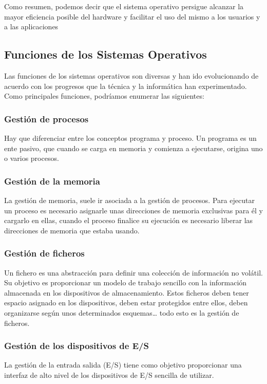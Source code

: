 \documentclass[11pt]{article}
\begin{document}
Como resumen, podemos decir que el sistema operativo persigue alcanzar
la mayor eficiencia posible del hardware y facilitar el uso del mismo a
los usuarios y a las aplicaciones

\newpage
\subsection{Funciones de los Sistemas Operativos}
\label{sec:org7e8a05f}
Las funciones de los sistemas operativos son diversas y han ido
evolucionando de acuerdo con los progresos que la técnica y la
informática han experimentado. Como principales funciones, podríamos
enumerar las siguientes:

\subsubsection{Gestión de procesos}
\label{sec:org65be71b}
Hay que diferenciar entre los conceptos programa y proceso. Un programa
es un ente pasivo, que cuando se carga en memoria y comienza a
ejecutarse, origina uno o varios procesos.

\subsubsection{Gestión de la memoria}
\label{sec:org752bfe5}
La gestión de memoria, suele ir asociada a la gestión de procesos. Para
ejecutar un proceso es necesario asignarle unas direcciones de memoria
exclusivas para él y cargarlo en ellas, cuando el proceso finalice su
ejecución es necesario liberar las direcciones de memoria que estaba
usando.

\subsubsection{Gestión de ficheros}
\label{sec:org95340e9}
Un fichero es una abstracción para definir una colección de información
no volátil. Su objetivo es proporcionar un modelo de trabajo sencillo
con la información almacenada en los dispositivos de almacenamiento.
Estos ficheros deben tener espacio asignado en los dispositivos, deben
estar protegidos entre ellos, deben organizarse según unos determinados
esquemas\ldots{} todo esto es la gestión de ficheros.

\subsubsection{Gestión de los dispositivos de E/S}
\label{sec:org55da2e2}
La gestión de la entrada salida (E/S) tiene como objetivo proporcionar
una interfaz de alto nivel de los dispositivos de E/S sencilla de
utilizar.
\end{document}
